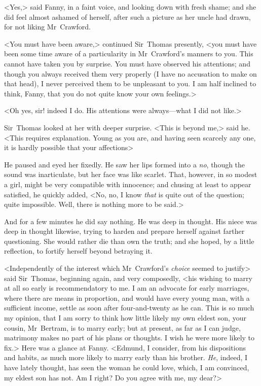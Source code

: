 <Yes,> said Fanny, in a faint voice, and looking down with fresh shame; and she did feel almost ashamed of herself, after such a picture as her uncle had drawn, for not liking Mr~Crawford.

<You must have been aware,> continued Sir~Thomas presently, <you must have been some time aware of a particularity in Mr~Crawford's manners to you. This cannot have taken you by surprise. You must have observed his attentions; and though you always received them very properly (I have no accusation to make on that head), I never perceived them to be unpleasant to you. I am half inclined to think, Fanny, that you do not quite know your own feelings.>

<Oh yes, sir! indeed I do. His attentions were always—what I did not like.>

Sir~Thomas looked at her with deeper surprise. <This is beyond me,> said he. <This requires explanation. Young as you are, and having seen scarcely any one, it is hardly possible that your affections\longdash>

He paused and eyed her fixedly. He saw her lips formed into a \textit{no}, though the sound was inarticulate, but her face was like scarlet. That, however, in so modest a girl, might be very compatible with innocence; and chusing at least to appear satisfied, he quickly added, <No, no, I know \textit{that}  is quite out of the question; quite impossible. Well, there is nothing more to be said.>

And for a few minutes he did say nothing. He was deep in thought. His niece was deep in thought likewise, trying to harden and prepare herself against farther questioning. She would rather die than own the truth; and she hoped, by a little reflection, to fortify herself beyond betraying it.

<Independently of the interest which Mr~Crawford's \textit{choice}  seemed to justify> said Sir~Thomas, beginning again, and very composedly, <his wishing to marry at all so early is recommendatory to me. I am an advocate for early marriages, where there are means in proportion, and would have every young man, with a sufficient income, settle as soon after four-and-twenty as he can. This is so much my opinion, that I am sorry to think how little likely my own eldest son, your cousin, Mr~Bertram, is to marry early; but at present, as far as I can judge, matrimony makes no part of his plans or thoughts. I wish he were more likely to fix.> Here was a glance at Fanny. <Edmund, I consider, from his dispositions and habits, as much more likely to marry early than his brother. \textit{He}, indeed, I have lately thought, has seen the woman he could love, which, I am convinced, my eldest son has not. Am I right? Do you agree with me, my dear?>

